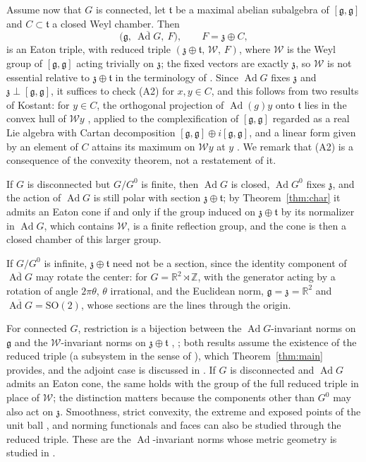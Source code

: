 \documentclass[11pt]{amsart}
\theoremstyle{plain}
\theoremstyle{definition}
\theoremstyle{remark}
\newcommand{\fg}{\mathfrak g}
\newcommand{\R}{\mathbb R}
\newcommand{\Z}{\mathbb Z}
\newcommand{\Ad}{\operatorname{Ad}}
\begin{document}
Assume now that $G$ is connected, let $\mathfrak t$ be a maximal abelian subalgebra of $[\fg,\fg]$ and $C\subset\mathfrak t$ a closed Weyl chamber. Then
\[
\big(\fg,\ \overline{\Ad G},\ F\big),\qquad F=\mathfrak z\oplus C,
\]
is an Eaton triple, with reduced triple $(\mathfrak z\oplus\mathfrak t,\,\mathcal W,\,F)$, where $\mathcal W$ is the Weyl group of $[\fg,\fg]$ acting trivially on $\mathfrak z$; the fixed vectors are exactly $\mathfrak z$, so $\mathcal W$ is not essential relative to $\mathfrak z\oplus\mathfrak t$ in the terminology of \cite{DolberryTam}. Since $\Ad G$ fixes $\mathfrak z$ and $\mathfrak z\perp[\fg,\fg]$, it suffices to check (A2) for $x,y\in C$, and this follows from two results of Kostant: for $y\in C$, the orthogonal projection of $\Ad(g)y$ onto $\mathfrak t$ lies in the convex hull of $\mathcal W y$ \cite[Theorem 8.2]{Kostant}, applied to the complexification of $[\fg,\fg]$ regarded as a real Lie algebra with Cartan decomposition $[\fg,\fg]\oplus i[\fg,\fg]$, and a linear form given by an element of $C$ attains its maximum on $\mathcal W y$ at $y$ \cite[Lemma 3.2]{Kostant}. We remark that (A2) is a consequence of the convexity theorem, not a restatement of it.

If $G$ is disconnected but $G/G^0$ is finite, then $\Ad G$ is closed, $\Ad G^0$ fixes $\mathfrak z$, and the action of $\Ad G$ is still polar with section $\mathfrak z\oplus\mathfrak t$; by Theorem~\ref{thm:char} it admits an Eaton cone if and only if the group induced on $\mathfrak z\oplus\mathfrak t$ by its normalizer in $\Ad G$, which contains $\mathcal W$, is a finite reflection group, and the cone is then a closed chamber of this larger group.

If $G/G^0$ is infinite, $\mathfrak z\oplus\mathfrak t$ need not be a section, since the identity component of $\overline{\Ad G}$ may rotate the center: for $G=\R^2\rtimes\Z$, with the generator acting by a rotation of angle $2\pi\theta$, $\theta$ irrational, and the Euclidean norm, $\fg=\mathfrak z=\R^2$ and $\overline{\Ad G}=\mathrm{SO}(2)$, whose sections are the lines through the origin.

For connected $G$, restriction is a bijection between the $\Ad G$-invariant norms on $\fg$ and the $\mathcal W$-invariant norms on $\mathfrak z\oplus\mathfrak t$ \cite[Theorem 6]{TamHill}, \cite[Theorem 6.5]{Lewis}; both results assume the existence of the reduced triple (a subsystem in the sense of \cite[Assumption 4.1]{Lewis}), which Theorem~\ref{thm:main} provides, and the adjoint case is discussed in \cite[Example 3]{TamHill}. If $G$ is disconnected and $\Ad G$ admits an Eaton cone, the same holds with the group of the full reduced triple in place of $\mathcal W$; the distinction matters because the components other than $G^0$ may also act on $\mathfrak z$. Smoothness, strict convexity, the extreme and exposed points of the unit ball \cite[Theorem 6.5]{Lewis}, and norming functionals and faces \cite{DolberryTam} can also be studied through the reduced triple. These are the $\Ad$-invariant norms whose metric geometry is studied in \cite{LR}.
\end{document}
